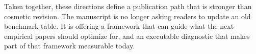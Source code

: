 Taken together, these directions define a publication path that is stronger than cosmetic revision. The manuscript is no longer asking readers to update an old benchmark table. It is offering a framework that can guide what the next empirical papers should optimize for, and an executable diagnostic that makes part of that framework measurable today.
